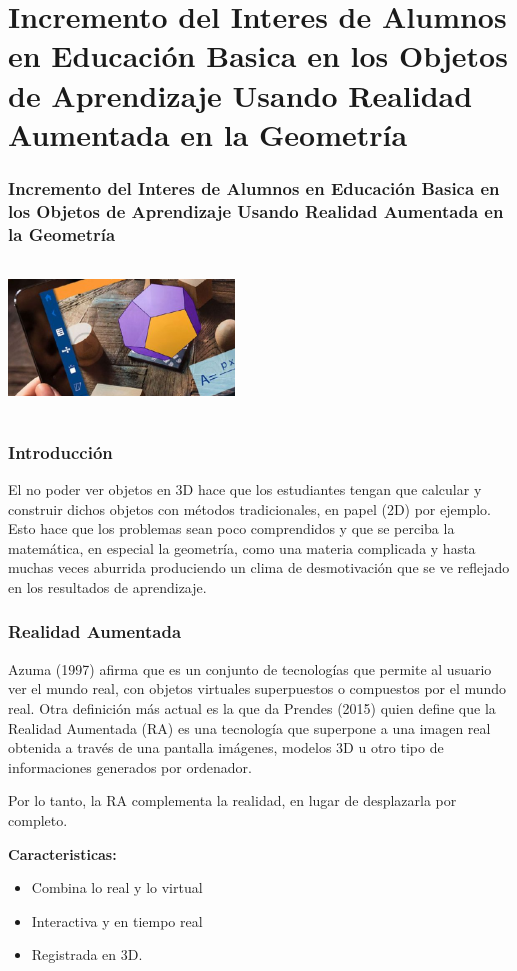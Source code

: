 \documentclass[11pt]{beamer}
\begin{document}
\section{Incremento del Interes de Alumnos en Educación Basica en los Objetos de Aprendizaje Usando Realidad Aumentada en la Geometría}
\begin{frame}
\frametitle{\center Incremento del Interes de Alumnos en Educación Basica en los Objetos de Aprendizaje Usando Realidad Aumentada en la Geometría}
\center \includegraphics[width=6cm, height=4cm]{img/RA.png} \center
\end{frame}

\begin{frame}
\frametitle{Introducción}
El no poder ver objetos en 3D  hace que los estudiantes tengan que calcular y construir  dichos objetos con métodos tradicionales, en papel (2D) por ejemplo. Esto hace que los problemas sean poco comprendidos y que se perciba la matemática, en especial la geometría, como una materia complicada y hasta muchas veces aburrida produciendo un clima de desmotivación que se ve reflejado en  los resultados de aprendizaje.

\end{frame}

\begin{frame}
\frametitle{Realidad Aumentada}

Azuma (1997) afirma que es un conjunto de tecnologías que permite al usuario ver el mundo real, con objetos virtuales superpuestos o compuestos por el mundo real. Otra definición más actual es la que da Prendes (2015) quien define que la Realidad Aumentada (RA) es una tecnología que superpone a una imagen real obtenida a través de una pantalla imágenes, modelos 3D u otro tipo de informaciones generados por ordenador.

Por lo tanto, la RA complementa la realidad, en lugar de desplazarla por completo.

\textbf{}

\textbf{Caracteristicas:}

\begin{itemize}
\item Combina lo real y lo virtual
\item Interactiva y en tiempo real
\item Registrada en 3D.
\end{itemize}
\end{frame}
\end{document}
